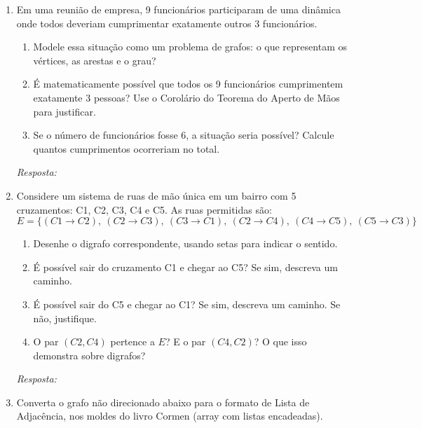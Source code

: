 \documentclass[12pt]{article}
\newcommand{\quadro}[1]{\vspace{0.2cm}\begin{tcolorbox}[colback=white, colframe=black, height=#1, boxrule=0.5pt, arc=0pt] \textit{Resposta:} \end{tcolorbox}}
\begin{document}
\begin{enumerate}[label=\arabic*), leftmargin=1.5cm, itemsep=0.8cm]
\item Em uma reunião de empresa, 9 funcionários participaram de uma dinâmica onde todos deveriam cumprimentar exatamente outros 3 funcionários.

\begin{enumerate}[label=\alph*)]
    \item Modele essa situação como um problema de grafos: o que representam os vértices, as arestas e o grau?
    \item É matematicamente possível que todos os 9 funcionários cumprimentem exatamente 3 pessoas? Use o Corolário do Teorema do Aperto de Mãos para justificar.
    \item Se o número de funcionários fosse 6, a situação seria possível? Calcule quantos cumprimentos ocorreriam no total.
\end{enumerate}
\quadro{6cm}

\item Considere um sistema de ruas de mão única em um bairro com 5 cruzamentos: C1, C2, C3, C4 e C5. As ruas permitidas são:
\[
    E = \{(C1 \to C2),\ (C2 \to C3),\ (C3 \to C1),\ (C2 \to C4),\ (C4 \to C5),\ (C5 \to C3)\}
\]
\begin{enumerate}[label=\alph*)]
    \item Desenhe o digrafo correspondente, usando setas para indicar o sentido.
    \item É possível sair do cruzamento C1 e chegar ao C5? Se sim, descreva um caminho.
    \item É possível sair do C5 e chegar ao C1? Se sim, descreva um caminho. Se não, justifique.
    \item O par $(C2, C4)$ pertence a $E$? E o par $(C4, C2)$? O que isso demonstra sobre digrafos?
\end{enumerate}
\begin{center}
\end{center}
\quadro{12cm}

\item Converta o grafo não direcionado abaixo para o formato de Lista de Adjacência, nos moldes do livro Cormen (array com listas encadeadas).


\end{enumerate}
\end{document}
